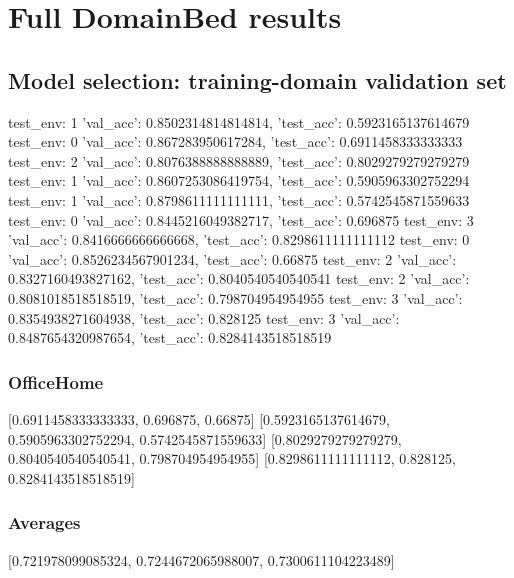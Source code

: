 \documentclass{article}
\begin{document}
\section{Full DomainBed results}

\subsection{Model selection: training-domain validation set}
test_env: 1
{'val_acc': 0.8502314814814814, 'test_acc': 0.5923165137614679}
test_env: 0
{'val_acc': 0.867283950617284, 'test_acc': 0.6911458333333333}
test_env: 2
{'val_acc': 0.8076388888888889, 'test_acc': 0.8029279279279279}
test_env: 1
{'val_acc': 0.8607253086419754, 'test_acc': 0.5905963302752294}
test_env: 1
{'val_acc': 0.8798611111111111, 'test_acc': 0.5742545871559633}
test_env: 0
{'val_acc': 0.8445216049382717, 'test_acc': 0.696875}
test_env: 3
{'val_acc': 0.8416666666666668, 'test_acc': 0.8298611111111112}
test_env: 0
{'val_acc': 0.8526234567901234, 'test_acc': 0.66875}
test_env: 2
{'val_acc': 0.8327160493827162, 'test_acc': 0.8040540540540541}
test_env: 2
{'val_acc': 0.8081018518518519, 'test_acc': 0.798704954954955}
test_env: 3
{'val_acc': 0.8354938271604938, 'test_acc': 0.828125}
test_env: 3
{'val_acc': 0.8487654320987654, 'test_acc': 0.8284143518518519}

\subsubsection{OfficeHome}
[0.6911458333333333, 0.696875, 0.66875]
[0.5923165137614679, 0.5905963302752294, 0.5742545871559633]
[0.8029279279279279, 0.8040540540540541, 0.798704954954955]
[0.8298611111111112, 0.828125, 0.8284143518518519]

\begin{center}
\end{center}

\subsubsection{Averages}
[0.721978099085324, 0.7244672065988007, 0.7300611104223489]

\begin{center}
\end{center}
\end{document}
